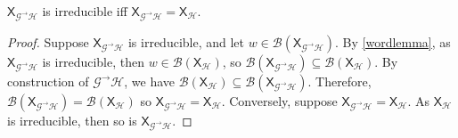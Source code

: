 \documentclass{article}
\newcommand{\Lc}{\mathcal{L}}  %
\newcommand{\Gc}{\mathcal{G}}  %
\newcommand{\Hc}{\mathcal{H}}  %
\newcommand{\Bc}{\mathcal{B}}
\newcommand{\GtH}{\Gc^\to\Hc}
\newcommand{\shift}[1]{\mathsf{X}_{#1}}
\theoremstyle{definition}
\begin{document}


\begin{theorem}
    \(\shift{\GtH}\) is irreducible iff \(\shift{\GtH} = \shift{\Hc}\).
\end{theorem}

\begin{proof}
    Suppose \(\shift{\GtH}\) is irreducible, and let \(w \in \Bc(\shift{\GtH})\). By \ref{wordlemma}, 
    as \(\shift{\GtH}\) is irreducible, then \(w \in \Bc(\shift{\Hc})\), so \(\Bc(\shift{\GtH}) \subseteq \Bc(\shift{\Hc})\).
    By construction of \(\GtH\), we have \(\Bc(\shift{\Hc}) \subseteq \Bc(\shift{\GtH})\). Therefore, 
    \(\Bc(\shift{\GtH}) = \Bc(\shift{\Hc})\) so \(\shift{\GtH} = \shift{\Hc}\).
    Conversely, suppose \(\shift{\GtH} = \shift{\Hc}\). As \(\shift{\Hc}\) is irreducible, then so 
    is \(\shift{\GtH}\).
\end{proof}
\end{document}
